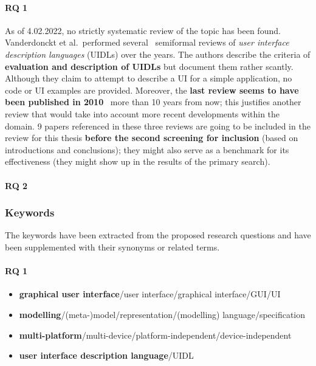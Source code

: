 \paragraph{RQ 1}
As of 4.02.2022, no strictly systematic review of the topic has been found.
Vanderdonckt et al.\ performed several~\cite{souchon_review_2003,guerrero_garcia_theoretical_2009,guerrero_garcia_theoretical_2011}
semiformal reviews of \emph{user interface description languages} (UIDLs) over the years.
The authors describe the criteria of \textbf{evaluation and description of UIDLs} but document them rather scantly.
Although they claim to attempt to describe a UI for a simple application, no code or UI examples are provided.
Moreover, the \textbf{last review seems to have been published in 2010} \textendash\ more than 10 years from now;
this justifies another review that would take into account more recent developments within the domain.
9 papers referenced in these three reviews are going to be included in the review for this thesis
\textbf{before the second screening for inclusion} (based on introductions and conclusions);
they might also serve as a benchmark for its effectiveness (they might show up in the results of the primary search).

\paragraph{RQ 2}

\subsubsection{Keywords}
The keywords have been extracted from the proposed research questions
and have been supplemented with their synonyms or related terms.

\paragraph{RQ 1}

\begin{itemize}
    \item \textbf{graphical user interface}/user interface/graphical interface/GUI/UI
    \item \textbf{modelling}/(meta-)model/representation/(modelling) language/specification
    \item \textbf{multi-platform}/multi-device/platform-independent/device-independent
    \item \textbf{user interface description language}/UIDL
\end{itemize}

